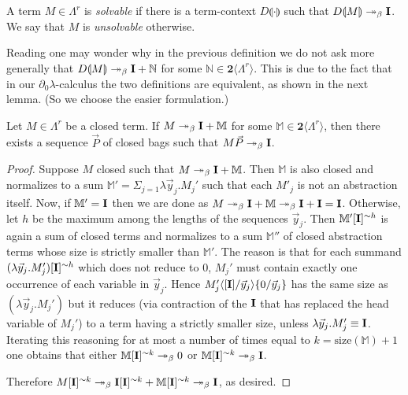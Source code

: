\documentclass{LMCS}
\newcommand{\size}[1]{\mathrm{size}(#1)}
\newcommand{\bool}{\mathbf{2}}
\newcommand{\dzlam}{\ensuremath{\partial_0\lambda}}
\renewcommand{\hole}[1]{\llparenthesis #1\rrparenthesis}
\newcommand{\Set}[1]{\Lambda^{#1}}
\newcommand{\sums}[1]{\bool\langle\Set{#1}\rangle}
\newcommand{\msto}{\twoheadrightarrow}
\newcommand{\subst}[2]{\{ #2 / #1 \}}	\newcommand{\dg}[2]{\mathrm{deg}_{#1}(#2)} \newcommand{\obsle}{\sqsubseteq_{\mathcal{O}}}
\newcommand{\seq}[1]{\vec{#1}}
\newcommand{\sM}{\mathbb{M}}
\newcommand{\sN}{\mathbb{N}}
\newcommand{\gb}{\beta}
\begin{document}
\begin{defi}\label{def:dzlam-solvable}
A term $M\in\Set{r}$ is \emph{solvable} if there is a term-context $D\hole{\cdot}$ such that $D\hole{M}\msto_\gb \bold{I}$. We say that $M$ is \emph{unsolvable}
 otherwise.
\end{defi}

Reading \cite{PaganiR11,PaganiR10} one may wonder why in the previous definition we do not ask more generally that $D\hole{M}\msto_\gb \bold{I} + \sN$ for some $\sN\in\sums{r}$.
This is due to the fact that in our \dzlam-calculus the two definitions are equivalent, as shown in the next lemma. 
(So we choose the easier formulation.)

\begin{lem}\label{lemma:easylemma}
Let $M\in\Set{r}$ be a closed term. If $M\msto_\gb \bold{I} + \sM$ for some $\sM\in\sums{r}$, then there exists a sequence $\seq P$ of closed bags such that
 $M\seq P\msto_\gb \bold{I}$.
\end{lem}

\begin{proof}
Suppose $M$ closed such that $M\msto_\gb \bold{I} + \sM$.
Then $\sM$ is also closed and normalizes to a sum $\sM'=\Sigma_{j=1} \lambda \seq y_j.M_j'$
such that each $M'_j$ is not an abstraction itself. 
Now, if $\sM' = \bold{I}$ then we are done as $M\msto_\gb \bold{I} + \sM\msto_\gb \bold{I} + \bold{I} = \bold{I}$.
Otherwise, let $h$ be the maximum among the lengths of the sequences $\seq y_j$. 
Then $\sM'[\bold{I}]^{\sim h}$ is again a sum of closed terms
 and normalizes to a sum $\sM''$ of closed abstraction terms whose size is strictly smaller than $\sM'$. The reason is that for each summand
 $(\lambda \seq y_j.M_j')[\bold{I}]^{\sim h}$ which does not reduce to $0$, $M_j'$ must contain exactly one occurrence of each variable in $\seq y_j$.
 Hence $M_j'\lsubst{{\seq y_j}}{[\bold{I}]}\subst{\seq y_j}{0}$ has the same size as $(\lambda \seq y_j.M_j')$ but it reduces (via contraction of the $\bold{I}$ that has replaced the head
 variable of $M_j'$) to a term having a strictly smaller size, unless $\lambda \seq y_j.M_j' \equiv \bold{I}$. Iterating this reasoning for at most a number of times 
 equal to $k = \size{\sM}+1$ one obtains that either $\sM[\bold{I}]^{\sim k}\msto_\gb 0$ or $\sM[\bold{I}]^{\sim k}\msto_\gb \bold{I}$.
 
Therefore $M[\bold{I}]^{\sim k}\msto_\gb \bold{I}[\bold{I}]^{\sim k} + \sM[\bold{I}]^{\sim k}\msto_\gb \bold{I}$, as desired.
\end{proof}
\end{document}
